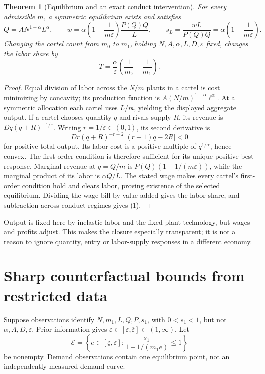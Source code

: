 \documentclass[11pt,a4paper]{article}
\newtheorem{theorem}{Theorem}[section]
\theoremstyle{definition}
\theoremstyle{remark}
\begin{document}
\begin{theorem}[Equilibrium and an exact conduct intervention]
For every admissible $m$, a symmetric equilibrium exists and satisfies
\[
 Q=A N^{1-\alpha}L^\alpha,\qquad
 w=\alpha\left(1-\frac1{m\varepsilon}\right)\frac{P(Q)Q}{L},\qquad
 s_L=\frac{wL}{P(Q)Q}=\alpha\left(1-\frac1{m\varepsilon}\right).
\]
Changing the cartel count from $m_0$ to $m_1$, holding $N,A,\alpha,L,D,\varepsilon$ fixed, changes the labor share by
\[
 T=\frac\alpha\varepsilon\left(\frac1{m_0}-\frac1{m_1}\right).\tag{1}
\]
\end{theorem}
\begin{proof}
Equal division of labor across the $N/m$ plants in a cartel is cost minimizing by concavity; its production function is $A(N/m)^{1-\alpha}\ell^\alpha$. At a symmetric allocation each cartel uses $L/m$, yielding the displayed aggregate output. If a cartel chooses quantity $q$ and rivals supply $R$, its revenue is $Dq(q+R)^{-1/\varepsilon}$. Writing $r=1/\varepsilon\in(0,1)$, its second derivative is
\[
 Dr(q+R)^{-r-2}\bigl[(r-1)q-2R\bigr]<0
\]
for positive total output. Its labor cost is a positive multiple of $q^{1/\alpha}$, hence convex. The first-order condition is therefore sufficient for its unique positive best response. Marginal revenue at $q=Q/m$ is $P(Q)(1-1/(m\varepsilon))$, while the marginal product of its labor is $\alpha Q/L$. The stated wage makes every cartel's first-order condition hold and clears labor, proving existence of the selected equilibrium. Dividing the wage bill by value added gives the labor share, and subtraction across conduct regimes gives (1).
\end{proof}

Output is fixed here by inelastic labor and the fixed plant technology, but wages and profits adjust. This makes the closure especially transparent; it is not a reason to ignore quantity, entry or labor-supply responses in a different economy.

\section{Sharp counterfactual bounds from restricted data}
Suppose observations identify $N,m_1,L,Q,P,s_1$, with $0<s_1<1$, but not $\alpha,A,D,\varepsilon$. Prior information gives $\varepsilon\in[\underline\varepsilon,\overline\varepsilon]\subset(1,\infty)$. Let
\[
 \mathcal E=\left\{e\in[\underline\varepsilon,\overline\varepsilon]:
 \frac{s_1}{1-1/(m_1e)}\leq1\right\}
\]
be nonempty. Demand observations contain one equilibrium point, not an independently measured demand curve.
\end{document}
